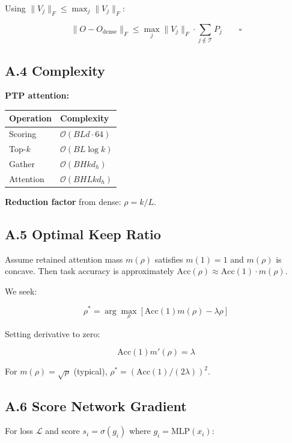 Using $\|V_j\|_F \leq \max_j \|V_j\|_F$:

\[
\|O - O_\text{dense}\|_F \leq \max_j \|V_j\|_F \cdot \sum_{j \notin \mathcal{T}} P_j \qquad \square
\]

\subsection{A.4 Complexity}

\textbf{PTP attention:}

\begin{table}[H]
\centering
\small
\begin{tabular}{ll}
\toprule
\textbf{Operation} & \textbf{Complexity} \\
\midrule
Scoring & $\mathcal{O}(B L d \cdot 64)$ \\
Top-$k$ & $\mathcal{O}(B L \log k)$ \\
Gather & $\mathcal{O}(B H k d_h)$ \\
Attention & $\mathcal{O}(B H L k d_h)$ \\
\bottomrule
\end{tabular}
\end{table}

\textbf{Reduction factor} from dense: $\rho = k / L$.

\subsection{A.5 Optimal Keep Ratio}

Assume retained attention mass $m(\rho)$ satisfies $m(1) = 1$ and 
$m(\rho)$ is concave. Then task accuracy is approximately 
$\text{Acc}(\rho) \approx \text{Acc}(1) \cdot m(\rho)$.

We seek:

\[
\rho^* = \arg\max_\rho \left[\text{Acc}(1) m(\rho) - \lambda \rho\right]
\tag{A.2}
\]

Setting derivative to zero:

\[
\text{Acc}(1) m'(\rho) = \lambda
\tag{A.3}
\]

For $m(\rho) = \sqrt{\rho}$ (typical), $\rho^* = (\text{Acc}(1) / (2\lambda))^2$.

\subsection{A.6 Score Network Gradient}

For loss $\mathcal{L}$ and score $s_i = \sigma(g_i)$ where 
$g_i = \text{MLP}(x_i)$:

